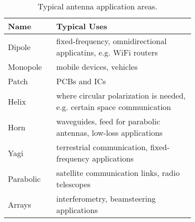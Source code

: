 
\begin{table}[h]

\centering

\begin{minipage}{\textwidth}
  \centering
\begin{tabular}{p{0.15\linewidth}p{0.6\linewidth}} \toprule
    {Name} & Typical Uses\\ \midrule\midrule
    Dipole & fixed-frequency, omnidirectional applicatins, e.g. WiFi routers \\ \midrule
    Monopole & mobile devices, vehicles\\ \midrule
    Patch & PCBs and ICs\\ \midrule
    Helix & where circular polarization is needed, e.g. certain space communication\\ \midrule
    Horn & waveguides, feed for parabolic antennas, low-loss applications\\\midrule
    Yagi & terrestrial communication, fixed-frequency applications \\\midrule
    Parabolic & satellite communication links, radio telescopes\\\midrule
    Arrays & interferometry, beamsteering applications\\
    \bottomrule
\end{tabular}
\end{minipage}

\caption{Typical antenna application areas.}\label{tab:ant2}

\end{table}


